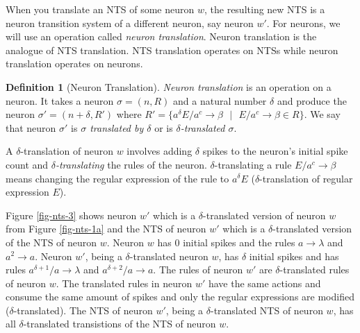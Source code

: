 \documentclass[]{elsarticle}
\theoremstyle{definition}
\newtheorem{definition2}{Definition}
\theoremstyle{definition}
\newcommand{\ra}{\rightarrow}
\newcommand{\se}{\text{ }}
\begin{document}

When you translate an NTS of some neuron $w$, the resulting new NTS is a neuron transition system 
of a different neuron, say neuron $w'$. For neurons, we will use an operation called \emph{neuron
translation}. Neuron translation is the analogue of NTS translation. NTS translation operates on
NTSs while neuron translation operates on neurons.


\begin{definition2}[Neuron Translation]
\emph{Neuron translation} is an operation on a neuron. It takes a neuron $\sigma=(n,R)$ and a
natural number $\delta$ and produce the neuron $\sigma'=(n+\delta, R')$ where 
$R'=\{a^{\delta}E/a^c \ra \beta\se|\se E/a^c\ra \beta \in R\}$. We say that neuron $\sigma'$ is
\emph{$\sigma$ translated by $\delta$} or is \emph{$\delta$-translated $\sigma$}.
\end{definition2}


A $\delta$-translation of neuron $w$ involves adding $\delta$ spikes to the neuron's initial spike
count and \emph{$\delta$-translating} the rules of the neuron. $\delta$-translating a rule 
$E/a^c\ra \beta$ means changing the regular expression of the rule to $a^{\delta}E$ 
($\delta$-translation of regular expression $E$). 

Figure \ref{fig-nts-3} shows neuron $w'$ which is a $\delta$-translated version of neuron $w$
from Figure \ref{fig-nts-1a} and the NTS of neuron $w'$ which is a $\delta$-translated version of
the NTS of neuron $w$. Neuron $w$ has $0$ initial spikes and the rules $a\ra\lambda$ and $a^2\ra a$. 
Neuron $w'$, being a $\delta$-translated neuron $w$, has $\delta$ initial spikes and has rules
$a^{\delta+1}/a\ra\lambda$ and $a^{\delta+2}/a\ra a$. The rules of neuron $w'$ are 
$\delta$-translated rules of neuron $w$. The translated rules in neuron $w'$ have the same actions
and consume the same amount of spikes and only the regular expressions are modified 
($\delta$-translated). The NTS of neuron $w'$, being a $\delta$-translated NTS of neuron $w$, has
all $\delta$-translated transistions of the NTS of neuron $w$. 

\end{document}
